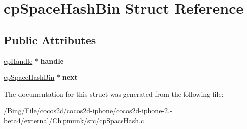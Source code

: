 \hypertarget{structcp_space_hash_bin}{\section{cp\-Space\-Hash\-Bin Struct Reference}
\label{structcp_space_hash_bin}
}
\subsection*{Public Attributes}
\begin{DoxyCompactItemize}
\item 
\hypertarget{structcp_space_hash_bin_a14955a28db482dfee0885c2496e101f3}{\hyperlink{structcp_handle}{cp\-Handle} $\ast$ {\bfseries handle}}\label{structcp_space_hash_bin_a14955a28db482dfee0885c2496e101f3}

\item 
\hypertarget{structcp_space_hash_bin_a9a86febff4b911e72bb6a8d00ef977f3}{\hyperlink{structcp_space_hash_bin}{cp\-Space\-Hash\-Bin} $\ast$ {\bfseries next}}\label{structcp_space_hash_bin_a9a86febff4b911e72bb6a8d00ef977f3}

\end{DoxyCompactItemize}


The documentation for this struct was generated from the following file\-:\begin{DoxyCompactItemize}
\item 
/\-Bing/\-File/cocos2d/cocos2d-\/iphone/cocos2d-\/iphone-\/2.-\/beta4/external/\-Chipmunk/src/cp\-Space\-Hash.\-c\end{DoxyCompactItemize}
